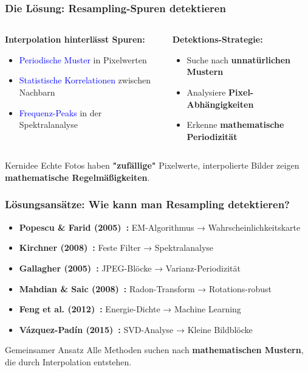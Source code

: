 \documentclass[11pt,t,usepdftitle=false,aspectratio=169]{beamer}
\begin{document}
\begin{frame}
	\frametitle{Die Lösung: Resampling-Spuren detektieren}
	\begin{columns}[T]
		\begin{column}{0.48\textwidth}
			\textbf{Interpolation hinterlässt Spuren:}
			\begin{itemize}
				\item \textcolor{blue}{Periodische Muster} in Pixelwerten
				\item \textcolor{blue}{Statistische Korrelationen} zwischen Nachbarn
				\item \textcolor{blue}{Frequenz-Peaks} in der Spektralanalyse
			\end{itemize}
		\end{column}
		\begin{column}{0.48\textwidth}
			\textbf{Detektions-Strategie:}
			\begin{itemize}
				\item Suche nach \textbf{unnatürlichen Mustern}
				\item Analysiere \textbf{Pixel-Abhängigkeiten}
				\item Erkenne \textbf{mathematische Periodizität}
			\end{itemize}
		\end{column}
	\end{columns}
	
	\vspace{1.5em}
	\begin{alertblock}{Kernidee}
		Echte Fotos haben \textbf{"zufällige"} Pixelwerte, interpolierte Bilder zeigen \textbf{mathematische Regelmäßigkeiten}.
	\end{alertblock}
\end{frame}

\begin{frame}
	\frametitle{Lösungsansätze: Wie kann man Resampling detektieren?}
	\begin{itemize}
		\item \textbf{Popescu \& Farid (2005)~\cite{popescu_exposing_2005}:} EM-Algorithmus → Wahrscheinlichkeitskarte
		\item \textbf{Kirchner (2008)~\cite{kirchner_fast_2008}:} Feste Filter → Spektralanalyse  
		\item \textbf{Gallagher (2005)~\cite{gallagher_detection_2005}:} JPEG-Blöcke → Varianz-Periodizität
		\item \textbf{Mahdian \& Saic (2008)~\cite{mahdian_blind_2008}:} Radon-Transform → Rotations-robust
		\item \textbf{Feng et al. (2012)~\cite{noauthor_pdf_2024}:} Energie-Dichte → Machine Learning
		\item \textbf{Vázquez-Padín (2015)~\cite{vazquez-padin_svd_2015}:} SVD-Analyse → Kleine Bildblöcke
	\end{itemize}
	
	\vspace{1.5em}
	\begin{alertblock}{Gemeinsamer Ansatz}
		Alle Methoden suchen nach \textbf{mathematischen Mustern}, die durch Interpolation entstehen.
	\end{alertblock}
\end{frame}
\end{document}
